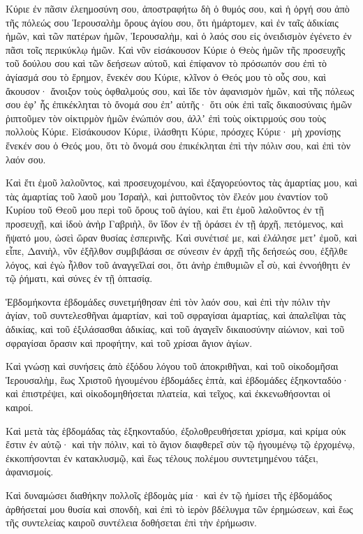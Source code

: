 {\par }{\PP {}Κύριε ἐν πᾶσιν ἐλεημοσύνη σου, ἀποστραφήτω δὴ ὁ θυμός σου, καὶ ἡ ὀργή σου ἀπὸ τῆς πόλεώς σου Ἱερουσαλὴμ ὄρους ἁγίου σου, ὅτι ἡμάρτομεν, καὶ ἐν ταῖς ἀδικίαις ἡμῶν, καὶ τῶν πατέρων ἡμῶν, Ἱερουσαλὴμ, καὶ ὁ λαός σου εἰς ὀνειδισμὸν ἐγένετο ἐν πᾶσι τοῖς περικύκλῳ ἡμῶν.
Καὶ νῦν εἰσάκουσον Κύριε ὁ Θεὸς ἡμῶν τῆς προσευχῆς τοῦ δούλου σου καὶ τῶν δεήσεων αὐτοῦ, καὶ ἐπίφανον τὸ πρόσωπόν σου ἐπὶ τὸ ἁγίασμά σου τὸ ἔρημον, ἔνεκέν σου Κύριε,
κλῖνον ὁ Θεός μου τὸ οὖς σου, καὶ ἄκουσον· ἄνοιξον τοὺς ὀφθαλμούς σου, καὶ ἴδε τὸν ἀφανισμὸν ἡμῶν, καὶ τῆς πόλεως σου ἐφʼ ἧς ἐπικέκληται τὸ ὄνομά σου ἐπʼ αὐτῆς· ὅτι οὐκ ἐπὶ ταῖς δικαιοσύναις ἡμῶν ῥιπτοῦμεν τὸν οἰκτιρμὸν ἡμῶν ἐνώπιόν σου, ἀλλʼ ἐπὶ τοὺς οἰκτιρμούς σου τοὺς πολλοὺς Κύριε.
Εἰσάκουσον Κύριε, ἱλάσθητι Κύριε, πρόσχες Κύριε· μὴ χρονίσῃς ἕνεκέν σου ὁ Θεός μου, ὅτι τὸ ὄνομά σου ἐπικέκληται ἐπὶ τὴν πόλιν σου, καὶ ἐπὶ τὸν λαόν σου.
\par }{\PP {}Καὶ ἔτι ἐμοῦ λαλοῦντος, καὶ προσευχομένου, καὶ ἐξαγορεύοντος τὰς ἁμαρτίας μου, καὶ τὰς ἁμαρτίας τοῦ λαοῦ μου Ἰσραὴλ, καὶ ῥιπτοῦντος τὸν ἔλεόν μου ἐναντίον τοῦ Κυρίου τοῦ Θεοῦ μου περὶ τοῦ ὄρους τοῦ ἁγίου,
καὶ ἔτι ἐμοῦ λαλοῦντος ἐν τῇ προσευχῇ, καὶ ἰδοὺ ἀνὴρ Γαβριὴλ, ὃν ἴδον ἐν τῇ ὁράσει ἐν τῇ ἀρχῆ, πετόμενος, καὶ ἥψατό μου, ὡσεὶ ὥραν θυσίας ἑσπερινῆς.
Καὶ συνέτισέ με, καὶ ἐλάλησε μετʼ ἐμοῦ, καὶ εἶπε, Δανιὴλ, νῦν ἐξῆλθον συμβιβάσαι σε σύνεσιν
ἐν ἀρχῇ τῆς δεήσεώς σου, ἐξῆλθε λόγος, καὶ ἐγὼ ἦλθον τοῦ ἀναγγεῖλαί σοι, ὅτι ἀνὴρ ἐπιθυμιῶν εἶ σὺ, καὶ ἐννοήθητι ἐν τῷ ῥήματι, καὶ σύνες ἐν τῇ ὀπτασίᾳ.
\par }{\PP {}Ἑβδομήκοντα ἑβδομάδες συνετμήθησαν ἐπὶ τὸν λαόν σου, καὶ ἐπὶ τὴν πόλιν τὴν ἁγίαν, τοῦ συντελεσθῆναι ἁμαρτίαν, καὶ τοῦ σφραγίσαι ἁμαρτίας, καὶ ἀπαλεῖψαι τὰς ἀδικίας, καὶ τοῦ ἐξιλάσασθαι ἀδικίας, καὶ τοῦ ἀγαγεῖν δικαιοσύνην αἰώνιον, καὶ τοῦ σφραγίσαι ὅρασιν καὶ προφήτην, καὶ τοῦ χρίσαι ἅγιον ἁγίων.
\par }{\PP {}Καὶ γνώσῃ καὶ συνήσεις ἀπὸ ἐξόδου λόγου τοῦ ἀποκριθῆναι, καὶ τοῦ οἰκοδομῆσαι Ἱερουσαλὴμ, ἓως Χριστοῦ ἡγουμένου ἑβδομάδες ἑπτὰ, καὶ ἑβδομάδες ἑξηκονταδύο· καὶ ἐπιστρέψει, καὶ οἰκοδομηθήσεται πλατεία, καὶ τεῖχος, καὶ ἐκκενωθήσονται οἱ καιροί.
\par }{\PP {}Καὶ μετὰ τὰς ἑβδομάδας τὰς ἑξηκονταδύο, ἐξολοθρευθήσεται χρίσμα, καὶ κρίμα οὐκ ἔστιν ἐν αὐτῷ· καὶ τὴν πόλιν, καὶ τὸ ἅγιον διαφθερεῖ σὺν τῷ ἡγουμένῳ τῷ ἐρχομένῳ, ἐκκοπήσονται ἐν κατακλυσμῷ, καὶ ἕως τέλους πολέμου συντετμημένου τάξει, ἀφανισμοίς.
\par }{\PP {}Καὶ δυναμώσει διαθήκην πολλοῖς ἑβδομὰς μία· καὶ ἐν τῷ ἡμίσει τῆς ἑβδομάδος ἀρθήσεταί μου θυσία καὶ σπονδὴ, καὶ ἐπὶ τὸ ἱερὸν βδέλυγμα τῶν ἐρημώσεων, καὶ ἕως τῆς συντελείας καιροῦ συντέλεια δοθήσεται ἐπὶ τὴν ἐρήμωσιν.

}
